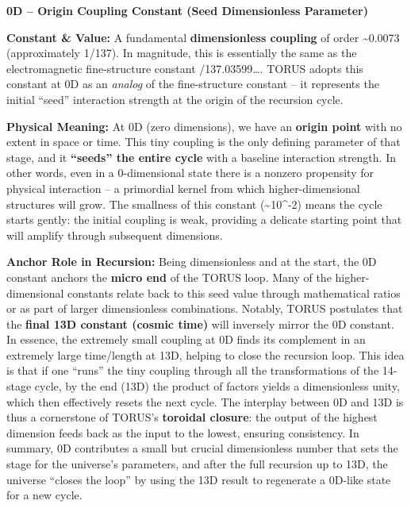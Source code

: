 \documentclass[
]{article}
\begin{document}
{\textbf{0D -- Origin Coupling Constant (Seed Dimensionless Parameter)}

\textbf{Constant \& Value:} A fundamental \textbf{dimensionless
coupling} of order \textasciitilde0.0073 (approximately
1/137)\hspace{0pt}. In magnitude, this is essentially the same as the
electromagnetic fine-structure constant \alpha {}/137.03599\ldots\hspace{0pt}. TORUS adopts this constant at 0D as an
\emph{analog} of the fine-structure constant -- it represents the
initial ``seed'' interaction strength at the origin of the recursion
cycle.

\textbf{Physical Meaning:} At 0D (zero dimensions), we have an
\textbf{origin point} with no extent in space or time. This tiny
coupling is the only defining parameter of that stage, and it
\textbf{``seeds'' the entire cycle} with a baseline interaction
strength\hspace{0pt}. In other words, even in a 0-dimensional state
there is a nonzero propensity for physical interaction -- a primordial
kernel from which higher-dimensional structures will grow. The smallness
of this constant (\textasciitilde10\^{}-2) means the cycle starts
gently: the initial coupling is weak, providing a delicate starting
point that will amplify through subsequent dimensions\hspace{0pt}.

\textbf{Anchor Role in Recursion:} Being dimensionless and at the start,
the 0D constant anchors the \textbf{micro end} of the TORUS loop. Many
of the higher-dimensional constants relate back to this seed value
through mathematical ratios or as part of larger dimensionless
combinations. Notably, TORUS postulates that the \textbf{final 13D
constant (cosmic time)} will inversely mirror the 0D
constant\hspace{0pt}. In essence, the extremely small coupling at 0D
finds its complement in an extremely large time/length at 13D, helping
to close the recursion loop. This idea is that if one ``runs'' the tiny
coupling through all the transformations of the 14-stage cycle, by the
end (13D) the product of factors yields a dimensionless unity, which
then effectively resets the next cycle\hspace{0pt}. The interplay
between 0D and 13D is thus a cornerstone of TORUS's \textbf{toroidal
closure}: the output of the highest dimension feeds back as the input to
the lowest, ensuring consistency. In summary, 0D contributes a small but
crucial dimensionless number that sets the stage for the universe's
parameters, and after the full recursion up to 13D, the universe
``closes the loop'' by using the 13D result to regenerate a 0D-like
state for a new cycle\hspace{0pt}.

}
\end{document}
